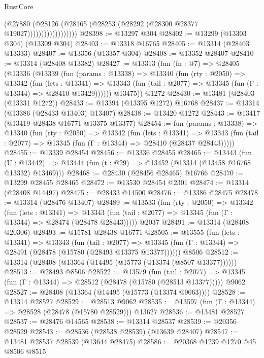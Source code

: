 \begin{lexlean}{RustCore}
\begin{coremodule}
                            (@27880
                              (@28126
                                (@28165 (@28253 (@28292 (@28300 @28377 @19027))))))))))))))))))
@28398 := @13297 @304
@28402 := @13299 (@13303 @304) (@13309 @304)
@28403 := @13318 @16765
@28405 := @13314 (@28403 @13333)
@28407 := @13356 (@13357 @304)
@28408 := @13352 @28407
@28410 := @13314 (@28408 @13382)
@28427 := @13313
    (fun (fn : @7) =>
    @28405
      (@13336
        (@13339
          (fun (params : @13338) =>
          @13340
            (fun (rty : @2050) =>
            @13342
              (fun (lets : @13341) =>
              @13343 (fun (tail : @2077) => @13345 (fun (Γ : @13344) => @28410 @13429))))))
        @13475))
    @1272
@28430 := @13481 (@28403 (@13331 @1272))
@28433 := @13394 (@13395 @1272) @16768
@28437 := @13314 (@13386 (@28433 @13403) @13407)
@28438 := @13420 @1272
@28443 := @13417 (@13419 @28438 @16771 @13375 @13377)
@28454 := fun (params : @13338) =>
  @13340
    (fun (rty : @2050) =>
    @13342
      (fun (lets : @13341) =>
      @13343 (fun (tail : @2077) => @13345 (fun (Γ : @13344) => @28410 (@28437 @28443)))))
@28455 := @13339 @28454
@28456 := @13336 @28455
@28465 := @13443
    (fun (U : @13442) => @13444 (fun (t : @29) => @13452 (@13314 (@13458 @16768 @13332) @13469)))
@28468 := @28430 (@28456 @28465) @16766
@28470 := @13299 @28455 @28465
@28472 := @13530 @28454 @2301
@28474 := @13314 (@28408 @14497)
@28475 := @28433 @14500
@28476 := @13386 @28475
@28478 := @13314 (@28476 @13407)
@28489 := @13533
    (fun (rty : @2050) =>
    @13342
      (fun (lets : @13341) =>
      @13343 (fun (tail : @2077) => @13345 (fun (Γ : @13344) => @28474 (@28478 @28443)))))
    @2037
@28491 := @13314 (@28408 @20306)
@28493 := @15781 @28438 @16771
@28505 := @13555
    (fun (lets : @13341) =>
    @13343
      (fun (tail : @2077) =>
      @13345 (fun (Γ : @13344) => @28491 (@28478 (@15780 (@28493 @13375 @13377))))))
    @8506
@28512 := @13314 (@28408 (@13364 (@14495 (@15773 (@13374 (@8507 @13377))))))
@28513 := @28493 @8506
@28522 := @13579
    (fun (tail : @2077) => @13345 (fun (Γ : @13344) => @28512 (@28478 (@15780 (@28513 @13377)))))
    @9062
@28527 := @28408 (@13364 (@14495 (@15773 (@13374 @9063))))
@28528 := @13314 @28527
@28529 := @28513 @9062
@28535 := @13597 (fun (Γ : @13344) => @28528 (@28478 (@15780 @28529))) @13627
@28536 := @13481 @28527
@28537 := @28476 @14565
@28538 := @13314 @28537
@28539 := @20356 @28529
@28543 := @28536 (@28538 @28539) (@13639 @28407)
@28547 := @13481 @28537 @28539 (@13644 @28475)
@28586 := @20368
    @1239
    @1270
    @45
    @8506
    @8515

\end{coremodule}
\end{lexlean}
